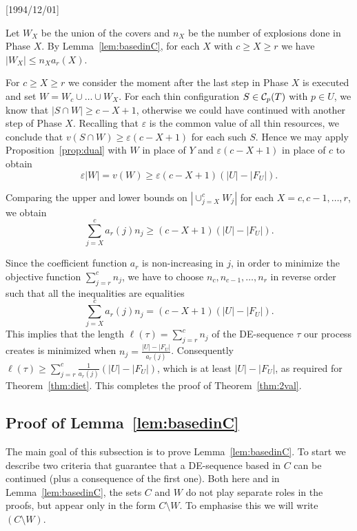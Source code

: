 \NeedsTeXFormat{LaTeX2e}[1994/12/01]\documentclass[letterpaper, 11pt]{article}
\theoremstyle{definition}
\theoremstyle{remark}
\numberwithin{equation}{section}
\begin{document}
Let $W_X$ be the union of the covers and $n_X$ be the 
number of explosions done in Phase $X$.
By Lemma~\ref{lem:basedinC},
for each $X$ with 
$c\geq X\geq r$ we have $|W_X|\leq n_Xa_r(X)$.

For $c\geq X \geq r$ we consider the moment 
after the last step in Phase $X$ is 
executed and set $W=W_c\cup\ldots\cup W_X$. 
For each thin configuration $S\in {\cal C}_p(T)$
with $p\in U$, we know that $|S\cap W|\geq c-X+1$,
otherwise we could have continued with another step of Phase $X$. 
Recalling that
  $\varepsilon$ is the common value of all thin resources, we conclude that $v(S\cap W)\geq\varepsilon(c-X+1)$
for each such $S$. Hence we may
  apply Proposition~\ref{prop:dual} with $W$ in place of $Y$ and
  $\varepsilon(c-X+1)$ in place of $c$ to obtain
  $$\varepsilon|W|=v(W)\geq\varepsilon(c-X+1)(|U|-|F_U|).$$

  
Comparing the upper and lower bounds on $|\cup_{j=X}^c W_j|$ for each
$X = c, c-1 , \ldots , r$, we obtain
$$ \sum_{j=X}^c a_r(j) n_j \geq (c-X+1)(|U|-|F_U|).$$ 

Since the coefficient function $a_r$ is non-increasing in $j$,
in order to minimize the objective function $\sum_{j=r}^c n_j$, we
have to choose $n_c, n_{c-1}, \ldots , n_r$  in reverse order such
that all the inequalities are equalities
$$ \sum_{j=X}^c a_r(j) n_j = (c-X+1)(|U|-|F_U|).$$
This implies that the length $\ell(\tau) = \sum_{j=r}^c n_j$ of the
DE-sequence $\tau$ our process creates is minimized when
$n_j = \frac{|U|-|F_U|}{a_r(j)}$. Consequently
$\ell(\tau) \geq \sum_{j=r}^c \frac{1}{a_r(j)} (|U| -|F_U|)$, which is 
at least $|U| -|F_U|$, as required for Theorem~\ref{thm:diet}. 
This completes the proof of Theorem~\ref{thm:2val}.







\subsection{Proof of Lemma~\ref{lem:basedinC}}\label{sec:shortDE}

The main goal of this subsection is to prove Lemma~\ref{lem:basedinC}. 
To start we describe two criteria that guarantee that a DE-sequence based in $C$ can be continued (plus a consequence of the first one). Both here and in Lemma~\ref{lem:basedinC}, the sets $C$ and $W$ do not play separate roles in the proofs, but appear only in the form $C\setminus W$. To emphasise this we will write $(C\setminus W)$.
\end{document}

